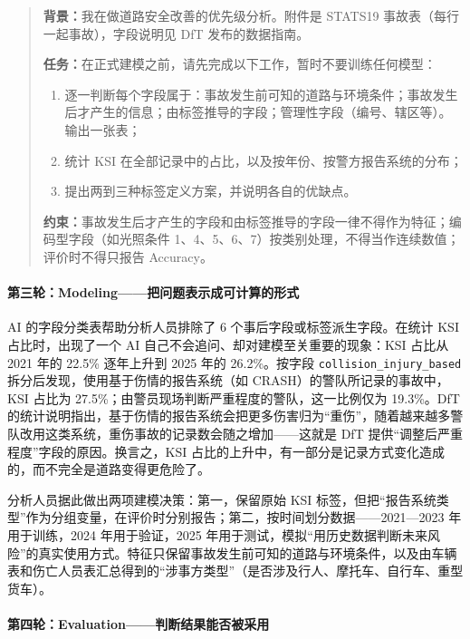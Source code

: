 \begin{quote}
\textbf{背景：}我在做道路安全改善的优先级分析。附件是 STATS19 事故表（每行一起事故），字段说明见 DfT 发布的数据指南。

\textbf{任务：}在正式建模之前，请先完成以下工作，暂时不要训练任何模型：
\begin{enumerate}
  \item 逐一判断每个字段属于：事故发生前可知的道路与环境条件；事故发生后才产生的信息；由标签推导的字段；管理性字段（编号、辖区等）。输出一张表；
  \item 统计 KSI 在全部记录中的占比，以及按年份、按警方报告系统的分布；
  \item 提出两到三种标签定义方案，并说明各自的优缺点。
\end{enumerate}

\textbf{约束：}事故发生后才产生的字段和由标签推导的字段一律不得作为特征；编码型字段（如光照条件 1、4、5、6、7）按类别处理，不得当作连续数值；评价时不得只报告 Accuracy。
\end{quote}

\paragraph{第三轮：Modeling——把问题表示成可计算的形式}

AI 的字段分类表帮助分析人员排除了 6 个事后字段或标签派生字段。在统计 KSI 占比时，出现了一个 AI 自己不会追问、却对建模至关重要的现象：KSI 占比从 2021 年的 22.5\% 逐年上升到 2025 年的 26.2\%。按字段 \texttt{collision\_injury\_based} 拆分后发现，使用基于伤情的报告系统（如 CRASH）的警队所记录的事故中，KSI 占比为 27.5\%；由警员现场判断严重程度的警队，这一比例仅为 19.3\%。DfT 的统计说明\cite{dft2019severity}指出，基于伤情的报告系统会把更多伤害归为“重伤”，随着越来越多警队改用这类系统，重伤事故的记录数会随之增加——这就是 DfT 提供“调整后严重程度”字段的原因。换言之，KSI 占比的上升中，有一部分是记录方式变化造成的，而不完全是道路变得更危险了。

分析人员据此做出两项建模决策：第一，保留原始 KSI 标签，但把“报告系统类型”作为分组变量，在评价时分别报告；第二，按时间划分数据——2021—2023 年用于训练，2024 年用于验证，2025 年用于测试，模拟“用历史数据判断未来风险”的真实使用方式。特征只保留事故发生前可知的道路与环境条件，以及由车辆表和伤亡人员表汇总得到的“涉事方类型”（是否涉及行人、摩托车、自行车、重型货车）。

\paragraph{第四轮：Evaluation——判断结果能否被采用}

